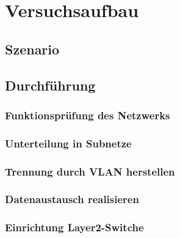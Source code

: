 \newpage
\section{Versuchsaufbau}

    \subsection{Szenario}

    \newpage
    \subsection{Durchführung}

        \subsubsection{Funktionsprüfung des Netzwerks}

        \newpage
        \subsubsection{Unterteilung in Subnetze}

        \newpage
        \subsubsection{Trennung durch VLAN herstellen}

        \newpage
        \subsubsection{Datenaustausch realisieren}

        \newpage
        \subsubsection{Einrichtung Layer2-Switche}